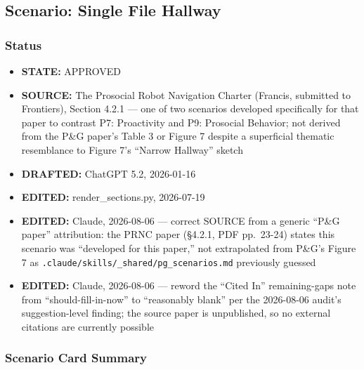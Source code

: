 \documentclass[utf8]{frontiers_suppmat} %
\providecommand{\tightlist}{%
  \setlength{\itemsep}{0pt}\setlength{\parskip}{0pt}}
\begin{document}
\subsection{Scenario: Single File
Hallway}\label{scenario-single-file-hallway}

\subsubsection{Status}\label{status}

\begin{itemize}
\tightlist
\item
  \textbf{STATE:} APPROVED
\item
  \textbf{SOURCE:} The Prosocial Robot Navigation Charter (Francis,
  submitted to Frontiers), Section 4.2.1 --- one of two scenarios
  developed specifically for that paper to contrast P7: Proactivity and
  P9: Prosocial Behavior; not derived from the P\&G paper's Table 3 or
  Figure 7 despite a superficial thematic resemblance to Figure 7's
  ``Narrow Hallway'' sketch
\item
  \textbf{DRAFTED:} ChatGPT 5.2, 2026-01-16
\item
  \textbf{EDITED:} render\_sections.py, 2026-07-19
\item
  \textbf{EDITED:} Claude, 2026-08-06 --- correct SOURCE from a generic
  ``P\&G paper'' attribution: the PRNC paper (§4.2.1, PDF pp.~23-24)
  states this scenario was ``developed for this paper,'' not
  extrapolated from P\&G's Figure 7 as
  \texttt{.claude/skills/\_shared/pg\_scenarios.md} previously guessed
\item
  \textbf{EDITED:} Claude, 2026-08-06 --- reword the ``Cited In''
  remaining-gaps note from ``should-fill-in-now'' to ``reasonably
  blank'' per the 2026-08-06 audit's suggestion-level finding; the
  source paper is unpublished, so no external citations are currently
  possible
\end{itemize}

\subsubsection{Scenario Card Summary}\label{scenario-card-summary}
\end{document}

